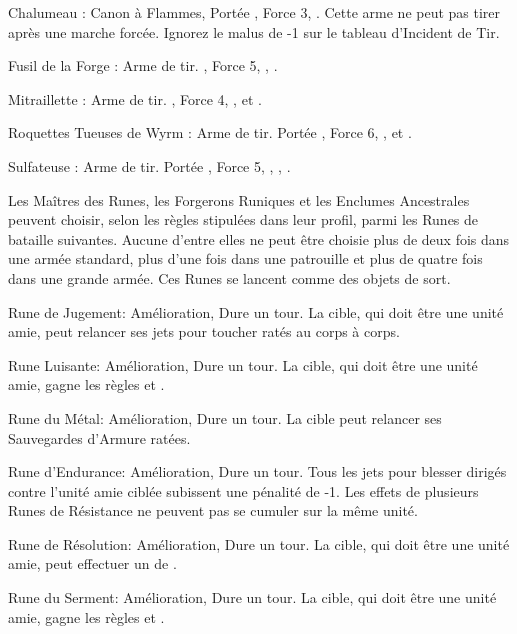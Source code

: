 
\begin{customdescription}
\item[Chalumeau :] Canon à Flammes, Portée , Force 3, \flamingattacks. Cette arme ne peut pas tirer après une marche forcée. Ignorez le malus de -1 sur le tableau d'Incident de Tir.
\item[Fusil de la Forge :] Arme de tir. , Force 5, \flamingattacks, \quicktofire.
\item[Mitraillette :] Arme de tir. , Force 4, ,   et \quicktofire.
\item[Roquettes Tueuses de Wyrm :] Arme de tir. Portée , Force 6, \flamingattacks,  et \reload.
\item[Sulfateuse :] Arme de tir. Portée , Force 5, \flamingattacks, , \quicktofire.
\end{customdescription}

\armymagicitems


Les Maîtres des Runes, les Forgerons Runiques et les Enclumes Ancestrales peuvent choisir, selon les règles stipulées dans leur profil, parmi les Runes de bataille suivantes. Aucune d'entre elles ne peut être choisie plus de deux fois dans une armée standard, plus d'une fois dans une patrouille et plus de quatre fois dans une grande armée. Ces Runes se lancent comme des objets de sort.

\begin{customdescription}
\item[Rune de Jugement:] Amélioration, Dure un tour. La cible, qui doit être une unité amie, peut relancer ses jets pour toucher ratés au corps à corps.
\item[Rune Luisante:] Amélioration, Dure un tour. La cible, qui doit être une unité amie, gagne les règles \hardtarget et \distracting.
\item[Rune du Métal:] Amélioration, Dure un tour. La cible peut relancer ses Sauvegardes d'Armure ratées.
\item[Rune d'Endurance:] Amélioration, Dure un tour. Tous les jets pour blesser dirigés contre l'unité amie ciblée subissent une pénalité de -1. Les effets de plusieurs Runes de Résistance ne peuvent pas se cumuler sur la même unité.
\item[Rune de Résolution:] Amélioration, Dure un tour. La cible, qui doit être une unité amie, peut effectuer un  de . 
\item[Rune du Serment:] Amélioration, Dure un tour. La cible, qui doit être une unité amie, gagne les règles \stubborn et \immunetopsychology.
\end{customdescription}

